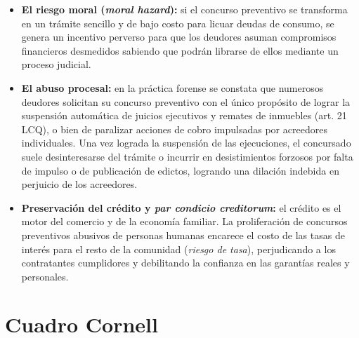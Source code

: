 \documentclass[12pt,oneside]{book}
\begin{document}
\begin{itemize}
    \item \textbf{El riesgo moral (\textit{moral hazard}):} si el concurso preventivo se transforma en un trámite sencillo y de bajo costo para licuar deudas de consumo, se genera un incentivo perverso para que los deudores asuman compromisos financieros desmedidos sabiendo que podrán librarse de ellos mediante un proceso judicial.

    \item \textbf{El abuso procesal:} en la práctica forense se constata que numerosos deudores solicitan su concurso preventivo con el único propósito de lograr la suspensión automática de juicios ejecutivos y remates de inmuebles (art. 21 LCQ), o bien de paralizar acciones de cobro impulsadas por acreedores individuales. Una vez lograda la suspensión de las ejecuciones, el concursado suele desinteresarse del trámite o incurrir en desistimientos forzosos por falta de impulso o de publicación de edictos, logrando una dilación indebida en perjuicio de los acreedores.

    \item \textbf{Preservación del crédito y \textit{par condicio creditorum}:} el crédito es el motor del comercio y de la economía familiar. La proliferación de concursos preventivos abusivos de personas humanas encarece el costo de las tasas de interés para el resto de la comunidad (\textit{riesgo de tasa}), perjudicando a los contratantes cumplidores y debilitando la confianza en las garantías reales y personales.
\end{itemize}

\section{Cuadro Cornell}
\end{document}
